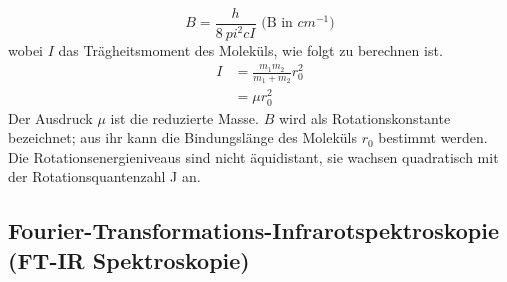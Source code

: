 \documentclass[12pt]{article}
\begin{document}
\begin{equation}
\label{eq:bconst}
B = \frac{h}{8 \ pi ^2 c I} \,\,  \text{(B in } cm^{-1})  
\end{equation}
wobei $I$ das Trägheitsmoment des Moleküls, 
wie folgt zu berechnen ist.
\begin{align}
\label{eq:trag}
I &=\frac{m_1 m_2 }{m_1 + m_2} r_0^2\\
&=\mu r_0^2
\end{align}
Der Ausdruck $\mu$ ist die reduzierte Masse.
$B$ wird als Rotationskonstante bezeichnet; aus ihr kann die Bindungslänge des Moleküls
$r_0$ bestimmt werden. Die Rotationsenergieniveaus sind nicht äquidistant, sie
wachsen quadratisch mit der Rotationsquantenzahl J an.

\subsection{ Fourier-Transformations-Infrarotspektroskopie (FT-IR Spektroskopie)~\supercite{harris}}
\end{document}
